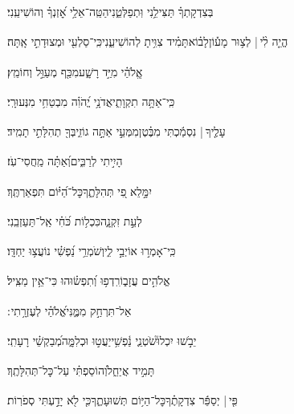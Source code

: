 \documentclass[12pt]{article}
\newcommand{\loc}[1]{\textsuperscript{\locf{#1}}}
\begin{document}
{\loc{ ב}~}‏בְּצִדְקָתְךָ֗ תַּצִּילֵ֥נִי וּֽתְפַלְּטֵ֑נִי{\hfill}הַטֵּֽה־אֵלַ֥י אׇ֝זְנְךָ֗ וְהוֹשִׁיעֵֽנִי׃\par

{\loc{ ג}~}‏הֱיֵ֤ה לִ֨י |  לְצ֥וּר מָע֡וֹן{\hfill}לָב֗וֹא\newline\hspace*{.5em}תָּמִ֗יד צִוִּ֥יתָ לְהוֹשִׁיעֵ֑נִי{\hfill}כִּֽי־סַלְעִ֖י וּמְצוּדָתִ֣י אָֽתָּה׃\par

{\loc{ ד}~}‏אֱֽלֹהַ֗י  מִיַּ֣ד רָשָׁ֑ע{\hfill}מִכַּ֖ף מְעַוֵּ֣ל וְחוֹמֵֽץ׃\par

{\loc{ ה}~}‏כִּֽי־אַתָּ֥ה תִקְוָתִ֑י{\hfill}אֲדֹנָ֥י יֱ֝הֹוִ֗ה מִבְטַחִ֥י מִנְּעוּרָֽי׃\par

{\loc{ ו}~}‏עָלֶ֤יךָ |  נִסְמַ֬כְתִּי מִבֶּ֗טֶן{\hfill}מִמְּעֵ֣י \newline\hspace*{.5em}אַתָּ֣ה גוֹזִ֑י{\hfill}בְּךָ֖ תְהִלָּתִ֣י תָמִֽיד׃\par

{\loc{ ז}~}‏ הָיִ֣יתִי לְרַבִּ֑ים{\hfill}וְ֝אַתָּ֗ה מַֽחֲסִי־עֹֽז׃\par

{\loc{ ח}~}‏יִמָּ֣לֵא פִ֭י תְּהִלָּתֶ֑ךָ{\hfill}כׇּל־הַ֝יּ֗וֹם תִּפְאַרְתֶּֽךָ׃\par

{\loc{ ט}~}‏ לְעֵ֣ת זִקְנָ֑ה{\hfill}כִּכְל֥וֹת כֹּ֝חִ֗י אַֽל־תַּעַזְבֵֽנִי׃\par

{\loc{ י}~}‏כִּֽי־אָמְר֣וּ אוֹיְבַ֣י לִ֑י{\hfill}וְשֹׁמְרֵ֥י נַ֝פְשִׁ֗י נוֹעֲצ֥וּ יַחְדָּֽו׃\par

{\loc{ יא}~}‏ אֱלֹהִ֣ים עֲזָב֑וֹ{\hfill}רִֽדְפ֥וּ וְ֝תִפְשׂ֗וּהוּ כִּי־אֵ֥ין מַצִּֽיל׃\par

{\loc{ יב}~}‏ אַל־תִּרְחַ֣ק מִמֶּ֑נִּי{\hfill}אֱ֝לֹהַ֗י לְעֶזְרָ֥תִי ׃\par

{\loc{ יג}~}‏יֵבֹ֣שׁוּ יִכְלוּ֮{\hfill}שֹׂטְנֵ֢י נַ֫פְשִׁ֥י\newline\hspace*{.5em}יַעֲט֣וּ  וּכְלִמָּ֑ה{\hfill}מְ֝בַקְשֵׁ֗י רָעָתִֽי׃\par

{\loc{ יד}~}‏ תָּמִ֣יד אֲיַחֵ֑ל{\hfill}וְ֝הוֹסַפְתִּ֗י עַל־כׇּל־תְּהִלָּתֶֽךָ׃\par

{\loc{ טו}~}‏פִּ֤י | {\hfill}יְסַפֵּ֬ר צִדְקָתֶ֗ךָ\newline\hspace*{.5em}כׇּל־הַיּ֥וֹם תְּשׁוּעָתֶ֑ךָ{\hfill}כִּ֤י לֹ֖א יָדַ֣עְתִּי סְפֹרֽוֹת׃\par
\end{document}
